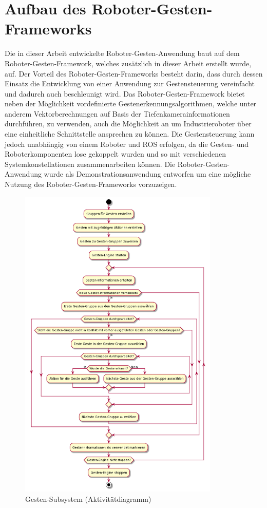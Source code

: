 
\section{Aufbau des Roboter-Gesten-Frameworks}
Die in dieser Arbeit entwickelte Roboter-Gesten-Anwendung baut auf dem Roboter-Gesten-Framework, welches zusätzlich in dieser Arbeit erstellt wurde, auf. Der Vorteil des Roboter-Gesten-Frameworks besteht darin, dass durch dessen Einsatz die Entwicklung von einer Anwendung zur Gestensteuerung vereinfacht und dadurch auch beschleunigt wird. Das Roboter-Gesten-Framework bietet neben der Möglichkeit vordefinierte Gestenerkennungsalgorithmen, welche unter anderem Vektorberechnungen auf Basis der Tiefenkamerainformationen durchführen, zu verwenden, auch die Möglichkeit an um Industrieroboter über eine einheitliche Schnittstelle ansprechen zu können. Die Gestensteuerung kann jedoch unabhängig von einem Roboter und ROS erfolgen, da die Gesten- und Roboterkomponenten lose gekoppelt wurden und so mit verschiedenen Systemkonstellationen zusammenarbeiten können. Die Roboter-Gesten-Anwendung wurde als Demonstrationsanwendung entworfen um eine mögliche Nutzung des Roboter-Gesten-Frameworks vorzuzeigen.

\begin{figure}[htb]
	\centering
	\includegraphics[width=0.85\textwidth]{images/loesungsweg/gesture_subsystem_uml}
	\caption[Gesten-Subsystem (Aktivitätdiagramm)]{Gesten-Subsystem (Aktivitätdiagramm)}
	\label{fig:gesture_subsystem_uml}
\end{figure}
\FloatBarrier

